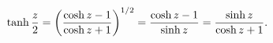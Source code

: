 \[\mathop{\tanh\/}\nolimits\frac{z}{2}=\left(\frac{\mathop{\cosh\/}\nolimits z-1%
}{\mathop{\cosh\/}\nolimits z+1}\right)^{1/2}=\frac{\mathop{\cosh\/}\nolimits z%
-1}{\mathop{\sinh\/}\nolimits z}=\frac{\mathop{\sinh\/}\nolimits z}{\mathop{%
\cosh\/}\nolimits z+1}.\]